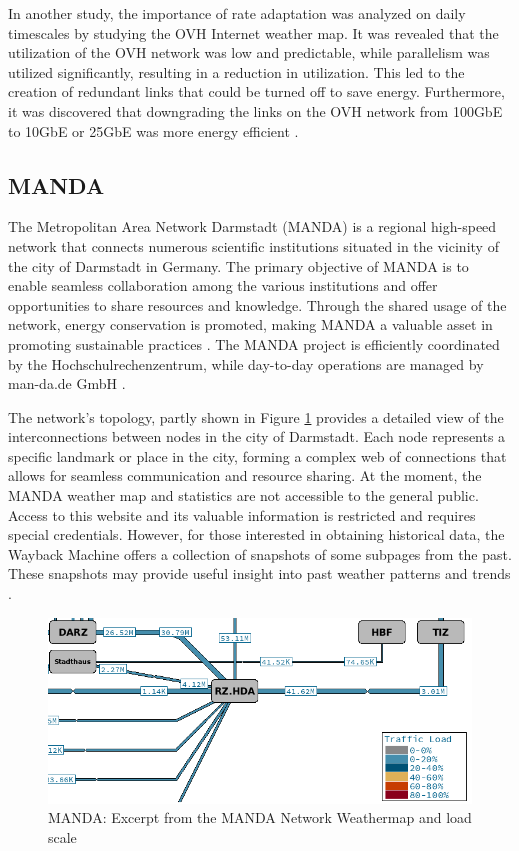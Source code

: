 \documentclass[sigconf,authorversion,nonacm]{acmart}
\begin{document}
In another study, the importance of rate adaptation was analyzed on daily timescales by studying the OVH Internet weather map. It was revealed that the utilization of the OVH network was low and predictable, while parallelism was utilized significantly, resulting in a reduction in utilization. This led to the creation of redundant links that could be turned off to save energy. Furthermore, it was discovered that downgrading the links on the OVH network from 100GbE to 10GbE or 25GbE was more energy efficient \cite{10.1145/3604930.3605713}.

\subsection{MANDA}
The Metropolitan Area Network Darmstadt (MANDA) is a regional high-speed network that connects numerous scientific institutions situated in the vicinity of the city of Darmstadt in Germany. The primary objective of MANDA is to enable seamless collaboration among the various institutions and offer opportunities to share resources and knowledge. Through the shared usage of the network, energy conservation is promoted, making MANDA a valuable asset in promoting sustainable practices \cite{manda1}. The MANDA project is efficiently coordinated by the Hochschulrechenzentrum, while day-to-day operations are managed by man-da.de GmbH \cite{manda2}. 

The network's topology, partly shown in Figure \ref{MANDA: MANDA Network Weathermap} provides a detailed view of the interconnections between nodes in the city of Darmstadt. Each node represents a specific landmark or place in the city, forming a complex web of connections that allows for seamless communication and resource sharing. At the moment, the MANDA weather map and statistics are not accessible to the general public. Access to this website and its valuable information is restricted and requires special credentials. However, for those interested in obtaining historical data, the Wayback Machine offers a collection of snapshots of some subpages from the past. These snapshots may provide useful insight into past weather patterns and trends \cite{gartner}.

\begin{figure}
    \centering
    \includegraphics[width=\linewidth]{MANDA/manda.png}
    \caption{MANDA: Excerpt from the MANDA Network Weathermap and load scale}
    \label{MANDA: MANDA Network Weathermap}
\end{figure}
\end{document}
